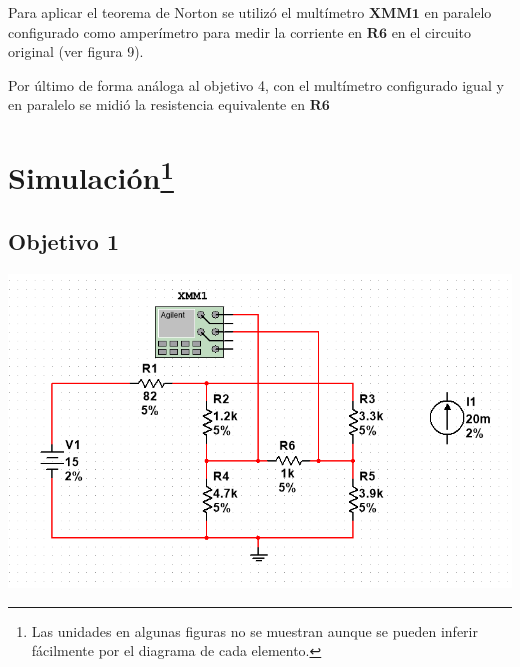 \documentclass[DIV=calc, paper=a4, fontsize=11pt]{scrartcl}
\newenvironment{Figura}
  {\par\medskip\noindent\minipage{\linewidth}}
  {\endminipage\par\medskip}
\begin{document}
\begin{multicols}{2}
Para aplicar el teorema de Norton se utilizó el multímetro $\mathbf{XMM1}$ en paralelo configurado como amperímetro para medir la corriente en $\mathbf{R6}$  en el circuito original (ver figura 9).

Por último de forma análoga al objetivo 4, con el multímetro configurado igual y en paralelo se midió la resistencia equivalente en $\mathbf{R6}$ 




\section*{Simulación\footnote{Las unidades en algunas figuras no se muestran aunque se pueden inferir fácilmente por el diagrama de cada elemento.}}

\subsection*{Objetivo 1}

\begin{Figura}
    \centering
    \includegraphics[width=1\textwidth]{1,a.PNG}
    \label{fig}
\end{Figura}


\end{multicols}
\end{document}
